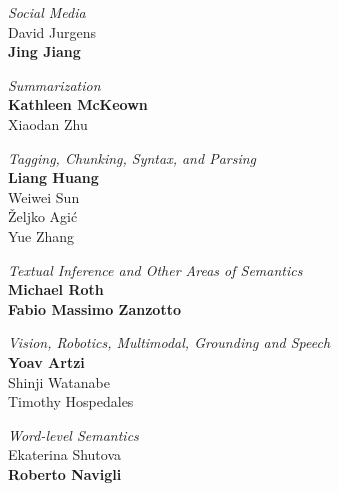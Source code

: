 \emph{Social Media}\\
\hspace*{5mm}David Jurgens \\
\hspace*{5mm}\textbf{Jing Jiang}

\emph{Summarization}\\
\hspace*{5mm}\textbf{Kathleen McKeown} \\
\hspace*{5mm}Xiaodan Zhu

\emph{Tagging, Chunking, Syntax, and Parsing} \\
\hspace*{5mm}\textbf{Liang Huang} \\
\hspace*{5mm}Weiwei Sun \\
\hspace*{5mm}Željko Agić \\
\hspace*{5mm}Yue Zhang

\emph{Textual Inference and Other Areas of Semantics}\\
\hspace*{5mm}\textbf{Michael Roth} \\
\hspace*{5mm}\textbf{Fabio Massimo Zanzotto}

\emph{Vision, Robotics, Multimodal, Grounding and Speech}\\
\hspace*{5mm}\textbf{Yoav Artzi} \\
\hspace*{5mm}Shinji Watanabe \\
\hspace*{5mm}Timothy Hospedales

\emph{Word-level Semantics}\\
\hspace*{5mm}Ekaterina Shutova \\
\hspace*{5mm}\textbf{Roberto Navigli}

